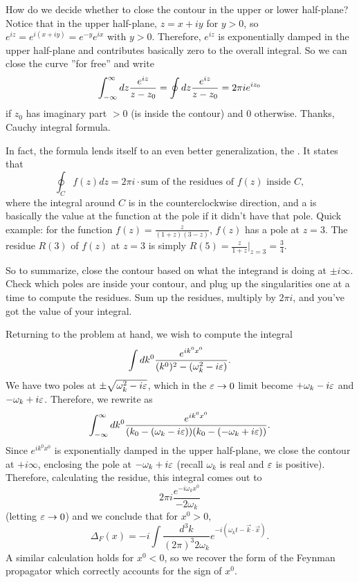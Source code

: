 How do we decide whether to close the contour in the upper or lower half-plane? Notice that in the upper half-plane, $z=x+iy$ for $y>0$, so $e^{iz}=e^{i(x+iy)}=e^{-y}e^{ix}$ with $y>0$. Therefore, $e^{iz}$ is exponentially damped in the upper half-plane and contributes basically zero to the overall integral. So we can close the curve ''for free'' and write
$$\int_{-\infty}^\infty dz \frac{e^{iz}}{z-z_0}=\oint dz \frac{e^{iz}}{z-z_0}=2\pi i e^{iz_0}$$
if $z_0$ has imaginary part $>0$ (is inside the contour) and $0$ otherwise. Thanks, Cauchy integral formula.

In fact, the formula lends itself to an even better generalization, the . It states that $$\oint_C f(z)dz = 2\pi i\cdot \text{sum of the residues of }f(z) \text{ inside } C,$$ where the integral around $C$ is in the counterclockwise direction, and a  is basically the value at the function at the pole if it didn't have that pole. Quick example: for the function $f(z)=\frac{z}{(1+z)(3-z)}$, $f(z)$ has a pole at $z=3$. The residue $R(3)$ of $f(z)$ at $z=3$ is simply $R(5)=\frac{z}{1+z}|_{z=3}=\frac{3}{4}.$

So to summarize, close the contour based on what the integrand is doing at $\pm i\infty$. Check which poles are inside your contour, and plug up the singularities one at a time to compute the residues. Sum up the residues, multiply by $2\pi i$, and you've got the value of your integral.

Returning to the problem at hand, we wish to compute the integral
$$\int dk^0 \frac{e^{i k^0 x^0}}{(k^0)^2-(\omega_k^2-i\varepsilon)}.$$ We have two poles at $\pm\sqrt{\omega_k^2-i\varepsilon}$, which in the $\varepsilon\to 0$ limit become $+\omega_k-i\varepsilon$ and $-\omega_k+i\varepsilon$. Therefore, we rewrite as
$$\int_{-\infty}^\infty dk^0 \frac{e^{i k^0 x^0}}{(k_0-(\omega_k-i\varepsilon))(k_0-(-\omega_k+i\varepsilon))}.$$
Since $e^{ik^0x^0}$ is exponentially damped in the upper half-plane, we close the contour at $+i\infty$, enclosing the pole at $-\omega_k+i\varepsilon$ (recall $\omega_k$ is real and $\varepsilon$ is positive). Therefore, calculating the residue, this integral comes out to
$$2\pi i \frac{e^{-i\omega_k x^0}}{-2\omega_k}$$
(letting $\varepsilon\to 0$) and we conclude that for $x^0>0$,
$$\Delta_F(x)=-i \int \frac{d^3 k}{(2\pi)^3 2\omega_k}e^{-i(\omega_k t- \vec{k}\cdot \vec{x})}.$$
A similar calculation holds for $x^0 < 0$, so we recover the form of the Feynman propagator which correctly accounts for the sign of $x^0$.